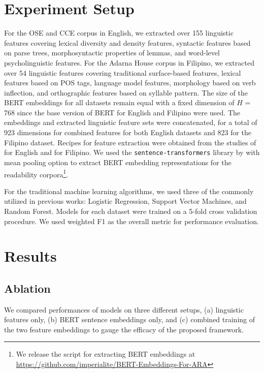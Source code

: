 \documentclass[11pt,a4paper]{article}
\begin{document}
\section{Experiment Setup}
For the OSE and CCE corpus in English, we extracted over 155 linguistic features covering lexical diversity and density features, syntactic features based on parse trees, morphosyntactic properties of lemmas, and word-level psycholinguistic features. For the Adarna House corpus in Filipino, we extracted over 54 linguistic features covering traditional surface-based features, lexical features based on POS tags, language model features, morphology based on verb inflection, and orthographic features based on syllable pattern. The size of the BERT embeddings for all datasets remain equal with a fixed dimension of $H$ = 768 since the base version of BERT for English \cite{devlin-etal-2019-bert} and Filipino \cite{localization2020cruz,establishing2020cruz,evaluating2019cruz} were used. The embeddings and extracted linguistic feature sets were concatenated, for a total of 923 dimensions for combined features for both English datasets and 823 for the Filipino dataset. Recipes for feature extraction were obtained from the studies of \citet{vajjalaM16,vajjala2014ReadabilityAF} for English and \citet{imperial2020exploring,imperial2021application,imperialASimple2021} for Filipino. We used the \texttt{sentence-transformers} library by \citet{reimers-2019-sentence-bert} with mean pooling option to extract BERT embedding representations for the readability corpora\footnote{We release the script for extracting BERT embeddings at \url{https://github.com/imperialite/BERT-Embeddings-For-ARA}}.

For the traditional machine learning algorithms, we used three of the commonly utilized in previous works: Logistic Regression, Support Vector Machines, and Random Forest. Models for each dataset were trained on a 5-fold cross validation procedure. We used weighted F1 as the overall metric for performance evaluation.


\section{Results}

\subsection{Ablation}
We compared performances of models on three different setups, (a) linguistic features only, (b) BERT sentence embeddings only, and (c) combined training of the two feature embeddings to gauge the efficacy of the proposed framework. 
\end{document}
